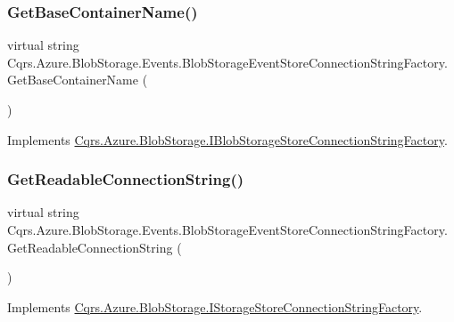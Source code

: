 \subsubsection{\texorpdfstring{Get\+Base\+Container\+Name()}{GetBaseContainerName()}}
{\footnotesize\ttfamily virtual string Cqrs.\+Azure.\+Blob\+Storage.\+Events.\+Blob\+Storage\+Event\+Store\+Connection\+String\+Factory.\+Get\+Base\+Container\+Name (\begin{DoxyParamCaption}{ }\end{DoxyParamCaption})\hspace{0.3cm}{\ttfamily [virtual]}}



Implements \hyperlink{interfaceCqrs_1_1Azure_1_1BlobStorage_1_1IBlobStorageStoreConnectionStringFactory_a57145e68e3bda84bc610fa61226a850c}{Cqrs.\+Azure.\+Blob\+Storage.\+I\+Blob\+Storage\+Store\+Connection\+String\+Factory}.

\mbox{\label{classCqrs_1_1Azure_1_1BlobStorage_1_1Events_1_1BlobStorageEventStoreConnectionStringFactory_aa47606e4cd5a71437bed71e07fda53ed}} 
\subsubsection{\texorpdfstring{Get\+Readable\+Connection\+String()}{GetReadableConnectionString()}}
{\footnotesize\ttfamily virtual string Cqrs.\+Azure.\+Blob\+Storage.\+Events.\+Blob\+Storage\+Event\+Store\+Connection\+String\+Factory.\+Get\+Readable\+Connection\+String (\begin{DoxyParamCaption}{ }\end{DoxyParamCaption})\hspace{0.3cm}{\ttfamily [virtual]}}



Implements \hyperlink{interfaceCqrs_1_1Azure_1_1BlobStorage_1_1IStorageStoreConnectionStringFactory_a0ed836289e048767f753630bbcc98d5d}{Cqrs.\+Azure.\+Blob\+Storage.\+I\+Storage\+Store\+Connection\+String\+Factory}.

